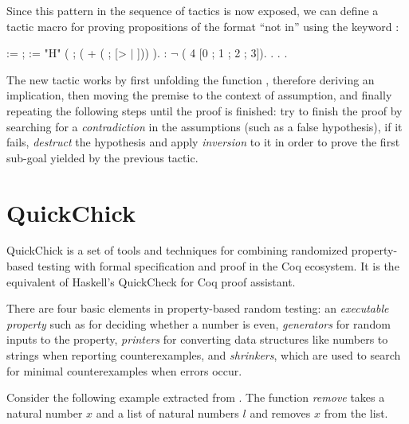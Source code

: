 Since this pattern in the sequence of tactics is now exposed, we can define a tactic macro for proving propositions of the format ``not in'' using the keyword :

\begin{coqdoccode}
	\coqdocnoindent
	  :=  ;\coqdoceol
	\coqdocindent{1.00em}
	  :=  "H"  (\coqdoceol
	\coqdocindent{2.00em}
	 ;  ( + ( ; [>   \ensuremath{|} ]))\coqdoceol
	\coqdocindent{1.00em}
	).\coqdoceol
	\coqdocemptyline
	\coqdocnoindent
	  : \ensuremath{\lnot} ( 4 [0 ; 1 ; 2 ; 3]).\coqdoceol
	\coqdocnoindent
	. . .\coqdoceol
\end{coqdoccode}

The new tactic  works by first unfolding the function , therefore deriving an implication, then moving the premise to the context of assumption, and finally repeating the following steps until the proof is finished: try to finish the proof by searching for a \emph{contradiction} in the assumptions (such as a false hypothesis), if it fails, \emph{destruct} the hypothesis and apply \emph{inversion} to it in order to prove the first sub-goal yielded by the previous tactic.

\section{QuickChick}
\label{section:quickchick}

QuickChick is a set of tools and techniques for combining randomized property-based testing with formal specification and proof in the Coq ecosystem. It is the equivalent of Haskell's QuickCheck for Coq proof assistant.

There are four basic elements in property-based random testing: an \emph{executable property} such as for deciding whether a number is even, \emph{generators} for random inputs to the property, \emph{printers} for converting data structures like numbers to strings when reporting counterexamples, and \emph{shrinkers}, which are used to search for minimal counterexamples when errors occur.

Consider the following example extracted from . The function \emph{remove} takes a natural number $ x $ and a list of natural numbers $ l $ and removes $ x $ from the list.

